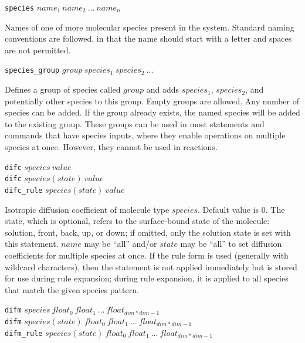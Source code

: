 \documentclass {scrbook}
\newcommand {\ttt} {\texttt}
\begin{document}
\begin{description}

\item{\ttt{species} $name_1\ name_2\ ...\ name_n$}

Names of one of more molecular species present in the system. Standard naming conventions are followed, in that the name should start with a letter and spaces are not permitted.

\item{\ttt{species\_group} $group\ species_1\ species_2\ ...$}

Defines a group of species called $group$ and adds $species_1$, $species_2$, and potentially other species to this group. Empty groups are allowed. Any number of species can be added. If the group already exists, the named species will be added to the existing group. These groups can be used in most statements and commands that have species inputs, where they enable operations on multiple species at once. However, they cannot be used in reactions.

\item{\ttt{difc} $species\ value$\\
\ttt{difc} $species(state)\ value$\\
\ttt{difc\_rule} $species(state)\ value$}

Isotropic diffusion coefficient of molecule type $species$. Default value is 0. The state, which is optional, refers to the surface-bound state of the molecule: solution, front, back, up, or down; if omitted, only the solution state is set with this statement. $name$ may be ``all'' and/or $state$ may be ``all'' to set diffusion coefficients for multiple species at once. If the rule form is used (generally with wildcard characters), then the statement is not applied immediately but is stored for use during rule expansion; during rule expansion, it is applied to all species that match the given species pattern.

\item{\ttt{difm} $species\ float_0\ float_1\ ...\ float_{dim*dim-1}$\\
\ttt{difm} $species(state)\ float_0\ float_1\ ...\ float_{dim*dim-1}$\\
\ttt{difm\_rule} $species(state)\ float_0\ float_1\ ...\ float_{dim*dim-1}$}


\end{description}
\end{document}
